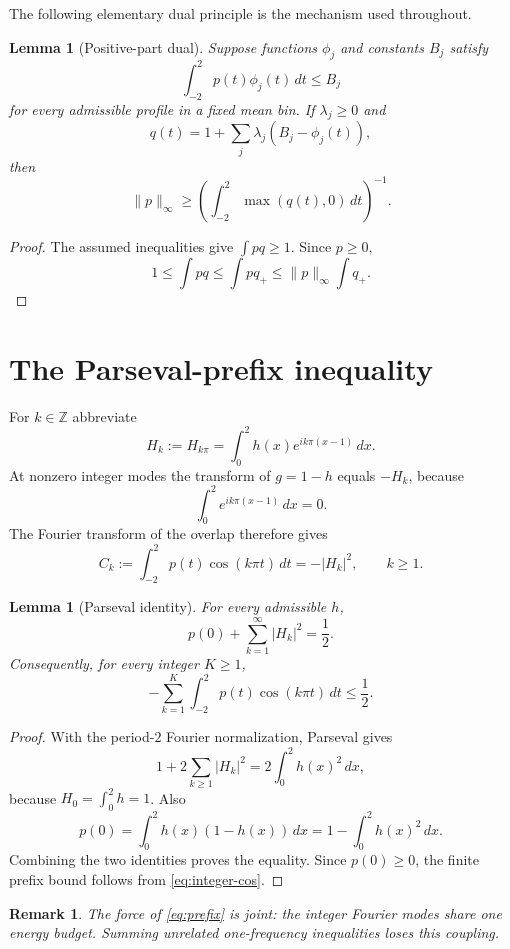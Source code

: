 \documentclass[11pt]{amsart}
\newtheorem{lemma}[theorem]{Lemma}
\newtheorem{remark}[theorem]{Remark}
\newcommand{\Z}{\mathbb Z}
\newcommand{\dd}{\,d}
\begin{document}
The following elementary dual principle is the mechanism used throughout.

\begin{lemma}[Positive-part dual]\label{lem:dual}
Suppose functions $\phi_j$ and constants $B_j$ satisfy
\[
 \int_{-2}^2p(t)\phi_j(t)\dd t\le B_j
\]
for every admissible profile in a fixed mean bin.  If $\lambda_j\ge0$ and
\[
 q(t)=1+\sum_j\lambda_j(B_j-\phi_j(t)),
\]
then
\[
 \|p\|_\infty\ge
 \left(\int_{-2}^2\max(q(t),0)\dd t\right)^{-1}.
\]
\end{lemma}

\begin{proof}
The assumed inequalities give $\int pq\ge1$.  Since $p\ge0$,
\[
 1\le\int pq\le\int p q_+
 \le\|p\|_\infty\int q_+.
\]
\end{proof}

\section{The Parseval-prefix inequality}

For $k\in\Z$ abbreviate
\[
 H_k:=H_{k\pi}=\int_0^2h(x)e^{ik\pi(x-1)}\dd x.
\]
At nonzero integer modes the transform of $g=1-h$ equals $-H_k$, because
\[
 \int_0^2e^{ik\pi(x-1)}\dd x=0.
\]
The Fourier transform of the overlap therefore gives
\begin{equation}\label{eq:integer-cos}
 C_k:=\int_{-2}^2p(t)\cos(k\pi t)\dd t=-|H_k|^2,
 \qquad k\ge1.
\end{equation}

\begin{lemma}[Parseval identity]\label{lem:parseval}
For every admissible $h$,
\[
 \boxed{p(0)+\sum_{k=1}^\infty |H_k|^2=\frac12}.
\]
Consequently, for every integer $K\ge1$,
\begin{equation}\label{eq:prefix}
 \boxed{-\sum_{k=1}^K\int_{-2}^2p(t)\cos(k\pi t)\dd t\le\frac12}.
\end{equation}
\end{lemma}

\begin{proof}
With the period-$2$ Fourier normalization, Parseval gives
\[
 1+2\sum_{k\ge1}|H_k|^2=2\int_0^2h(x)^2\dd x,
\]
because $H_0=\int_0^2h=1$.  Also
\[
 p(0)=\int_0^2h(x)(1-h(x))\dd x
 =1-\int_0^2h(x)^2\dd x.
\]
Combining the two identities proves the equality.  Since $p(0)\ge0$, the
finite prefix bound follows from \eqref{eq:integer-cos}.
\end{proof}

\begin{remark}
The force of \eqref{eq:prefix} is joint: the integer Fourier modes share one
energy budget.  Summing unrelated one-frequency inequalities loses this
coupling.
\end{remark}
\end{document}
